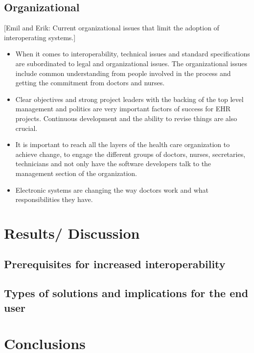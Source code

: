 \documentclass[14pt]{article}
\begin{document}
\subsection{Organizational}

[Emil and Erik: Current organizational issues that limit the adoption of interoperating systems.]

\begin{itemize}
\item When it comes to \gls{interoperability}, technical issues and standard specifications are subordinated to legal and organizational issues. The organizational issues include common understanding from people involved in the process and getting the commitment from doctors and nurses. 
\item Clear objectives and strong project leaders with the backing of the top level management and politics are very important factors of success for \gls{EHR} projects. Continuous development and the ability to revise things are also crucial.
\item It is important to reach all the layers of the health care organization to achieve change, to engage the different groups of doctors, nurses, secretaries, technicians and not only have the software developers talk to the management section of the organization.
\item Electronic systems are changing the way doctors work and what responsibilities they have.
\end{itemize}

\newpage

\section{Results/ Discussion}
\label{sec:Results}

\subsection{Prerequisites for increased interoperability}

\subsection{Types of solutions and implications for the end user}

\newpage

\section{Conclusions}
\label{sec:Conclusions}

\newpage

\begin{appendix}


\end{appendix}

\newpage

 
 
\end{document}
